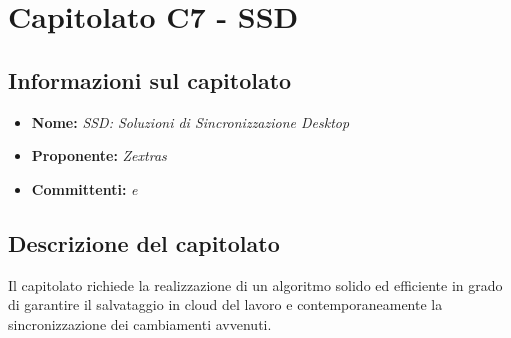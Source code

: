 \section{Capitolato C7 - SSD}
\subsection{Informazioni sul capitolato}
\begin{itemize}
	\item \textbf{Nome:} \textit{SSD: Soluzioni di Sincronizzazione Desktop}
	\item \textbf{Proponente:} \textit{Zextras}
	\item \textbf{Committenti:} \textit{\VT{} e \CR{}}
\end{itemize}

\subsection{Descrizione del capitolato}
Il capitolato richiede la realizzazione di un algoritmo solido ed efficiente in grado di garantire il salvataggio in cloud del lavoro e contemporaneamente la sincronizzazione
dei cambiamenti avvenuti.


